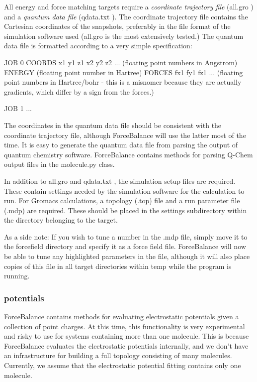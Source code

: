 \-All energy and force matching targets require a {\itshape coordinate trajectory file\/} ({\ttfamily all.\-gro} ) and a {\itshape  quantum data file \/} ({\ttfamily qdata.\-txt} ). \-The coordinate trajectory file contains the \-Cartesian coordinates of the snapshots, preferably in the file format of the simulation software used ({\ttfamily all.\-gro} is the most extensively tested.) \-The quantum data file is formatted according to a very simple specification\-:

\begin{DoxyVerb}
JOB 0
COORDS x1 y1 z1 x2 y2 z2 ... (floating point numbers in Angstrom)
ENERGY (floating point number in Hartree)
FORCES fx1 fy1 fz1 ... (floating point numbers in Hartree/bohr - this is a misnomer because they are actually gradients, which differ by a sign from the forces.)

JOB 1
...
\end{DoxyVerb}


\-The coordinates in the quantum data file should be consistent with the coordinate trajectory file, although \-Force\-Balance will use the latter most of the time. \-It is easy to generate the quantum data file from parsing the output of quantum chemistry software. \-Force\-Balance contains methods for parsing \-Q-\/\-Chem output files in the {\ttfamily molecule.\-py} class.

\-In addition to {\ttfamily all.\-gro} and {\ttfamily qdata.\-txt} , the simulation setup files are required. \-These contain settings needed by the simulation software for the calculation to run. \-For \-Gromacs calculations, a topology (.top) file and a run parameter file (.mdp) are required. \-These should be placed in the {\ttfamily settings} subdirectory within the directory belonging to the target.

\-As a side note\-: \-If you wish to tune a number in the .mdp file, simply move it to the {\ttfamily forcefield} directory and specify it as a force field file. \-Force\-Balance will now be able to tune any highlighted parameters in the file, although it will also place copies of this file in all target directories within {\ttfamily temp} while the program is running.\hypertarget{usage_Electrostatic}{}\subsubsection{potentials}\label{usage_Electrostatic}
\-Force\-Balance contains methods for evaluating electrostatic potentials given a collection of point charges. \-At this time, this functionality is very experimental and risky to use for systems containing more than one molecule. \-This is because \-Force\-Balance evaluates the electrostatic potentials internally, and we don't have an infrastructure for building a full topology consisting of many molecules. \-Currently, we assume that the electrostatic potential fitting contains only one molecule.

